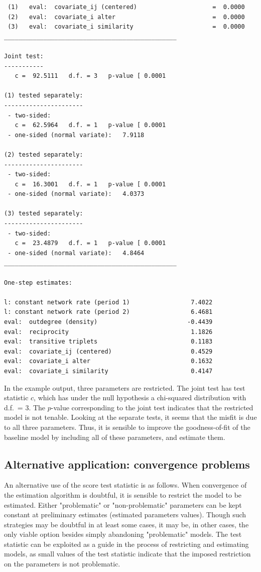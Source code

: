 \documentclass[a4paper,fleqn]{article}
\newcommand{\+}{\, + \,}
\begin{document}
{\begin{verbatim}
 (1)   eval:  covariate_ij (centered)                     =  0.0000
 (2)   eval:  covariate_i alter                           =  0.0000
 (3)   eval:  covariate_i similarity                      =  0.0000
________________________________________________

Joint test:
-----------
   c =  92.5111   d.f. = 3   p-value [ 0.0001

(1) tested separately:
----------------------
 - two-sided:
   c =  62.5964   d.f. = 1   p-value [ 0.0001
 - one-sided (normal variate):   7.9118

(2) tested separately:
----------------------
 - two-sided:
   c =  16.3001   d.f. = 1   p-value [ 0.0001
 - one-sided (normal variate):   4.0373

(3) tested separately:
----------------------
 - two-sided:
   c =  23.4879   d.f. = 1   p-value [ 0.0001
 - one-sided (normal variate):   4.8464
________________________________________________

One-step estimates:

l: constant network rate (period 1)                 7.4022
l: constant network rate (period 2)                 6.4681
eval:  outdegree (density)                         -0.4439
eval:  reciprocity                                  1.1826
eval:  transitive triplets                          0.1183
eval:  covariate_ij (centered)                      0.4529
eval:  covariate_i alter                            0.1632
eval:  covariate_i similarity                       0.4147
\end{verbatim}


In the example output, three parameters are restricted.
The joint test has test statistic $c$, which has under the
null hypothesis a chi-squared distribution with d.f.\ = 3.
The $p$-value corresponding to the joint test indicates
that the restricted model is not tenable. Looking at the separate
tests, it seems that the misfit is due to all three parameters.
Thus, it is sensible to improve
the goodness-of-fit of the baseline model by including all of these parameters,
and estimate them.

\subsection{Alternative application: convergence problems}
\label{alternative}

An alternative use of the score test statistic is as follows. When
convergence of the estimation algorithm is doubtful, it is sensible
to restrict the model to be estimated. Either "problematic" or
"non-problematic" parameters can be kept constant at preliminary
estimates (estimated parameters values). Though such strategies may
be doubtful in at least some cases, it may be, in other cases, the
only viable option besides simply abandoning "problematic" models.
The test statistic can be exploited as a guide in the process of
restricting and estimating models, as small values of the test
statistic indicate that the imposed restriction on the parameters is
not problematic.

}
\end{document}
